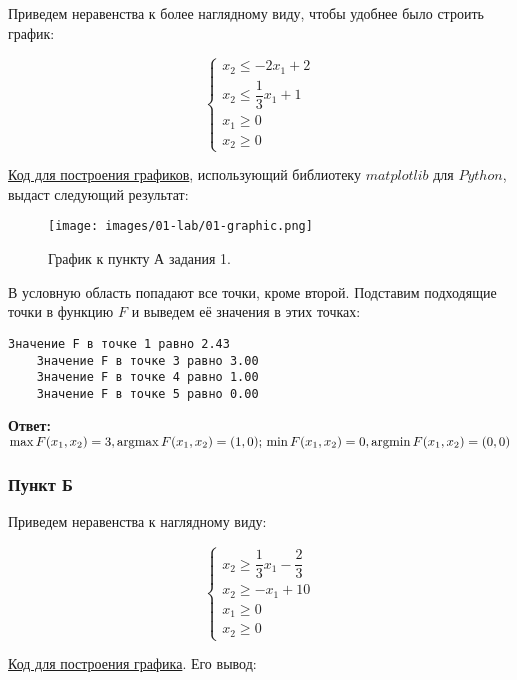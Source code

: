 Приведем неравенства к более наглядному виду, чтобы удобнее было строить график:

\[
    \begin{cases}
        x_2 \leq -2x_1 + 2           \\
        x_2 \leq \dfrac{1}{3}x_1 + 1 \\
        x_1 \geq 0                   \\
        x_2 \geq 0
    \end{cases}
\]

\href{https://github.com/retrobannerS/optimization_methods/blob/main/python/01-lab/A.%2001.py}{Код для построения графиков}, использующий библиотеку $matplotlib$ для $Python$, выдаст следующий результат:
\begin{figure}[H]
    \texttt{[image: images/01-lab/01-graphic.png]}
    \caption{График к пункту А задания 1.}
    \label{01-lab-01-graphic}
\end{figure}

В условную область попадают все точки, кроме второй. Подставим подходящие точки в функцию $F$ и выведем её значения в этих точках:

\begin{lstlisting}[language=text]
    Значение F в точке 1 равно 2.43
    Значение F в точке 3 равно 3.00
    Значение F в точке 4 равно 1.00
    Значение F в точке 5 равно 0.00
\end{lstlisting}

\textbf{Ответ:} $\max F(x_1, x_2) = 3, \operatorname*{argmax} F(x_1, x_2) = (1, 0);\\
    \min F(x_1, x_2) = 0, \operatorname*{argmin} F(x_1, x_2) = (0, 0)$ \label{01-lab-a-answer}

\subsubsection{Пункт Б}\label{01-lab-b}

Приведем неравенства к наглядному виду:

\[
    \begin{cases}
        x_2 \geq \dfrac{1}{3} x_1 - \dfrac{2}{3} \\
        x_2 \geq -x_1 + 10                       \\
        x_1 \geq 0                               \\
        x_2 \geq 0
    \end{cases}
\]

\href{https://github.com/retrobannerS/optimization_methods/blob/main/python/01-lab/B.%2001.py}{Код для построения графика}. Его вывод:

